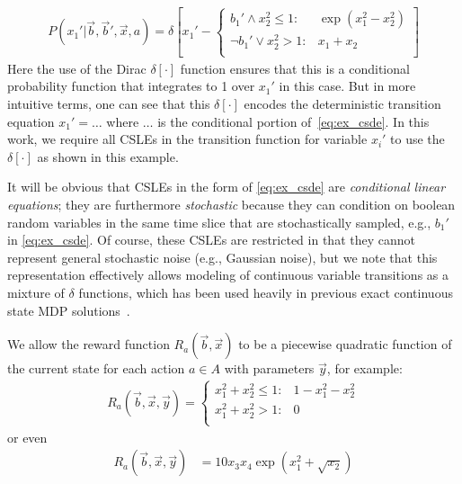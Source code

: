 \documentclass[letterpaper]{article}
\begin{document}
{\footnotesize
\begin{align}
P(x_1' | \vec{b},\vec{b}',\vec{x},a) = \delta\left[ x_1' - 
\begin{cases}
b_1' \land x_2^2 \leq 1 : & \exp(x_1^2 - x_2^2) \\
\neg b_1' \lor  x_2^2 > 1 : & x_1 + x_2 \\
\end{cases}
\right] \label{eq:ex_csde}
\end{align}}
Here %
the use of the Dirac $\delta[\cdot]$ function ensures that this is a
conditional probability function that integrates to 1 over $x_1'$
in this case.  But in more intuitive terms, one can see that this
$\delta[\cdot]$ encodes the deterministic transition 
equation $x_1' = \ldots$ where $\ldots$ is the conditional portion 
of~\eqref{eq:ex_csde}.
In this work, we require all CSLEs in the transition
function for variable $x_i'$ to use the $\delta[\cdot]$ as shown in this
example.

It will be obvious that CSLEs in the form of \eqref{eq:ex_csde} are
\emph{conditional linear equations}; they are furthermore \emph{stochastic}
because they can condition on boolean random variables in the same time slice
that are stochastically sampled, e.g., $b_1'$ in
\eqref{eq:ex_csde}.  Of course, these CSLEs are restricted in that
they cannot represent general stochastic noise (e.g., Gaussian noise),
but we note that this representation effectively allows modeling of
continuous variable transitions as a mixture of $\delta$ functions,
which has been used heavily in previous exact continuous state MDP 
solutions~\cite{feng04,li05,hao09}.  

We allow 
the reward function $R_a(\vec{b},\vec{x})$
to be a piecewise quadratic function of the current state
for each action $a \in A$ with parameters $\vec{y}$, for example:
\begin{align}
R_a(\vec{b},\vec{x},\vec{y}) = \begin{cases}
x_1^2 + x_2^2 \leq 1 : & 1 - x_1^2 - x_2^2  \\
x_1^2 + x_2^2 > 1 : & 0 \\
\end{cases} \label{eq:simple_reward}
\end{align}
or even 
\begin{align}
R_a(\vec{b},\vec{x},\vec{y}) & = 10 x_3 x_4 \exp(x_1^2 + \sqrt{x_2}) \label{eq:expr_reward}
\end{align}
\end{document}
